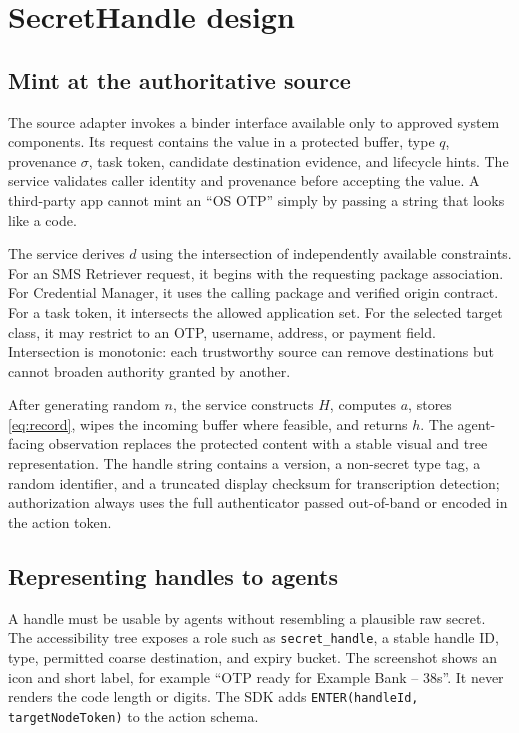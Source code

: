 \section{SecretHandle design}
\label{sec:method}



\subsection{Mint at the authoritative source}

The source adapter invokes a binder interface available only to approved system components. Its request contains the value in a protected buffer, type $q$, provenance $\sigma$, task token, candidate destination evidence, and lifecycle hints. The service validates caller identity and provenance before accepting the value. A third-party app cannot mint an ``OS OTP'' simply by passing a string that looks like a code.

The service derives $d$ using the intersection of independently available constraints. For an SMS Retriever request, it begins with the requesting package association. For Credential Manager, it uses the calling package and verified origin contract. For a task token, it intersects the allowed application set. For the selected target class, it may restrict to an OTP, username, address, or payment field. Intersection is monotonic: each trustworthy source can remove destinations but cannot broaden authority granted by another.

After generating random $n$, the service constructs $H$, computes $a$, stores \cref{eq:record}, wipes the incoming buffer where feasible, and returns $h$. The agent-facing observation replaces the protected content with a stable visual and tree representation. The handle string contains a version, a non-secret type tag, a random identifier, and a truncated display checksum for transcription detection; authorization always uses the full authenticator passed out-of-band or encoded in the action token.

\subsection{Representing handles to agents}

A handle must be usable by agents without resembling a plausible raw secret. The accessibility tree exposes a role such as \texttt{secret\_handle}, a stable handle ID, type, permitted coarse destination, and expiry bucket. The screenshot shows an icon and short label, for example ``OTP ready for Example Bank -- 38s''. It never renders the code length or digits. The SDK adds \texttt{ENTER(handleId, targetNodeToken)} to the action schema.

